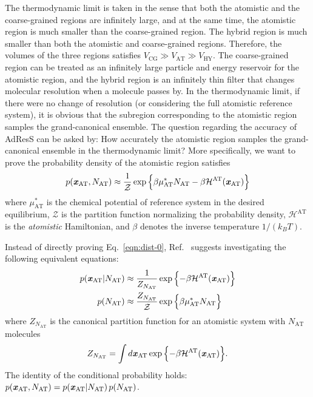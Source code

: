 \documentclass[epjST]{svjour}
\newcommand{\recheck}[1]{{\color{red} #1}}
\newcommand{\vect}[1]{\textbf{\textit{#1}}}
\newcommand{\mh}[0]{\mathcal {H}}
\newcommand{\AT}[0]{\textrm{AT}}
\newcommand{\HY}[0]{\textrm{HY}}
\newcommand{\CG}[0]{\textrm{CG}}
\begin{document}
The thermodynamic limit is taken in the sense that both the atomistic
and the coarse-grained regions are infinitely large, and at the same
time, the atomistic region is much smaller than the coarse-grained
region. The hybrid region is much smaller than both the atomistic and
coarse-grained regions.  Therefore, the volumes of the
three regions satisfies $V_\CG\gg V_\AT\gg V_\HY$.  The coarse-grained
region can be treated as an infinitely large particle and energy
reservoir for the atomistic region, and the hybrid region is an
infinitely thin filter that changes molecular resolution when a
molecule passes by. In the
thermodynamic limit, if there were no change of resolution (or
considering the full atomistic reference system), it is obvious that
the subregion corresponding to the atomistic region samples the
grand-canonical ensemble.  The question regarding the accuracy of
AdResS can be asked by: How accurately the atomistic region samples
the grand-canonical ensemble in the thermodynamic limit? More
specifically, we want to prove the probability density of the atomistic region satisfies
\begin{align}\label{eqn:dist-0}
  p(\vect x_\AT, N_\AT) \approx \frac{1}{\mathcal Z} \exp\Big\{{\beta\mu^\ast_\AT N_\AT - \beta \mh^\AT(\vect x_\AT)} \Big\}
\end{align}
where $\mu^\ast_\AT$ is the chemical potential of reference system in
the desired equilibrium, $\mathcal Z$ is the partition function
normalizing the probability density, $\mh^\AT$ is the \emph{atomistic}
Hamiltonian, \recheck{and $\beta$ denotes the inverse temperature $1/(k_BT)$.}

Instead of directly proving Eq.~\eqref{eqn:dist-0}, Ref.~\cite{wang2013grand}
suggests investigating the following equivalent equations:
\begin{align}\label{eqn:dist-1-0}
  p(\vect x_\AT \vert N_\AT) &\approx \frac{1}{Z_{N_\AT}} \exp\Big\{{- \beta \mh^\AT(\vect x_\AT)}\Big\}  \\\label{eqn:dist-1-1}
  p(N_\AT) & \approx \frac{ Z_{N_\AT}}{\mathcal Z} \exp\Big\{{\beta\mu^\ast_\AT N_\AT}\Big\}
\end{align}
where $Z_{N_\AT}$ is the canonical partition function for an atomistic
system with $N_\AT$ molecules
\begin{align}
  Z_{N_\AT} = \int d\vect x_{\AT} \exp\Big\{{- \beta \mh^\AT(\vect x_\AT)}\Big\}.
\end{align}
The identity of the conditional probability holds: $ p(\vect x_\AT, N_\AT)  = p(\vect x_\AT \vert N_\AT) \, p(N_\AT) $.
\end{document}

